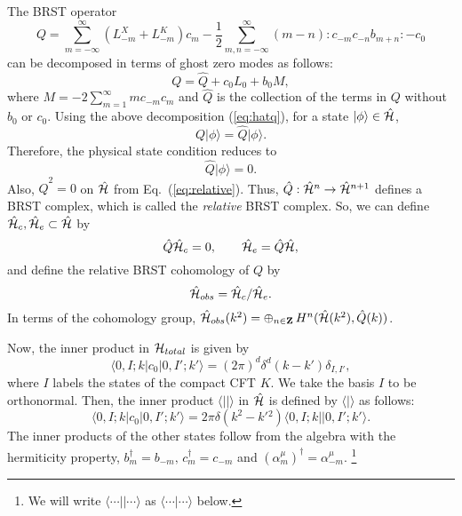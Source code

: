 \documentclass[a4paper,12pt]{article}
\newcommand{\bra}[1]{\mbox{$\langle #1 |$}}
\newcommand{\ket}[1]{\mbox{$| #1 \rangle$}}
\newcommand{\eq}[1]{(\ref{eq:#1})}
\begin{document}
The BRST operator
\begin{equation}
%
Q = \sum_{m=-\infty}^{\infty} ( L_{-m}^{X} + L_{-m}^{K} ) c_{m}
        - \frac{1}{2} \sum_{m,n=-\infty}^{\infty}
        (m-n) : c_{-m} c_{-n} b_{m+n} : - c_{0}
%
\end{equation}
can be decomposed in terms of ghost zero modes as follows:
\begin{equation}
%
Q = \hat{Q} + c_{0} L_{0} + b_{0} M,
        \label{eq:hatq}
%
\end{equation}
where $ M= -2 \sum^{\infty}_{m=1} m c_{-m} c_{m} $ and  $ \hat{Q} $ is the
collection of the terms in $ Q $ without $ b_{0} $ or $ c_{0} $.
Using the above decomposition (\ref{eq:hatq}), for a state $\ket{\phi} \in
\hat{\cal H}$,
\begin{equation}
%
Q \ket{\phi} = \hat{Q} \ket{\phi}.
        \label{eq:relative}
%
\end{equation}
Therefore, the physical state condition reduces to
\begin{equation}
%
\hat{Q} \ket{\phi} = 0.
%
\end{equation}
Also, $\hat{Q}^2=0$ on $\hat{\cal H}$ from Eq.~\eq{relative}. Thus,
$\hat{Q}: \hat{\cal H}^n \rightarrow \hat{\cal H}^{n+1} $
 defines a BRST complex, which is called the {\it relative} BRST
complex. So, we can define $\hat{\cal H}_{c}, \hat{\cal H}_{e}
\subset
\hat{\cal H}$ by
\begin{equation}
%
\hat{Q} \hat{\cal H}_{c} = 0, \qquad
\hat{\cal H}_{e} = \hat{Q} \hat{\cal H},
%
\end{equation}
and define the relative BRST cohomology of $Q$ by
\begin{equation}
%
\hat{\cal H}_{obs}=\hat{\cal H}_{c}/\hat{\cal H}_{e}.
%
\end{equation}
In terms of the cohomology group,
$\hat{\cal H}_{obs}(k^2)=\oplus_{n \in {\bf Z}}\, H^n(\hat{\cal
H}(k^2), \hat{Q}(k))$.

Now, the inner product in ${\cal H}_{total}$ is given by
\begin{equation}
%
\bra{0,I;k} c_{0} \ket{0,I';k'}
        = (2 \pi)^d \delta^d(k-k') \delta_{I,I'},
%
\end{equation}
where $I$ labels the states of the compact CFT $K$. We take the basis $I$
to be orthonormal. Then, the inner product $\bra{}\ket{}$ in $\hat{\cal H}$
 is defined by $\langle | \rangle$ as follows:
\begin{equation}
%
\bra{0,I;k} c_{0} \ket{0,I';k'}
        = 2 \pi \delta (k^2-k'{}^2) \bra{0,I;k} \ket{0,I';k'}.
%
\end{equation}
The inner products of the other states follow from the algebra
with the hermiticity property, $b_{m}^\dagger = b_{-m},\, c_{m}^\dagger = c_{-m}$
and
$(\alpha^{\mu}_{m})^\dagger = \alpha^{\mu}_{-m}$.%
\footnote{We will write $\bra{\cdots}\ket{\cdots}$ as $\langle \cdots |
\cdots \rangle$ below.}
\end{document}
